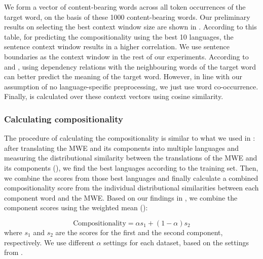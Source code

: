 \documentclass[output=paper,modfonts,nonflat]{langsci/langscibook}
\begin{document}
We form a vector of content-bearing words across all token occurrences
of the target word, on the basis of these 1000 content-bearing words. Our
preliminary results on selecting the best context window size are
shown in . According to this table, for
predicting the compositionality using the best 10 languages, the
sentence context window results in a higher correlation. We use
sentence boundaries as the context window in the rest of our
experiments. According to \citet{weeds2003} and
\citet{Pado:Lapata:2007}, using dependency relations with the
neighbouring words of the target word can better predict the meaning
of the target word. However, in line with our assumption of no
language-specific preprocessing, we just use word
co-occurrence. Finally,  is calculated over
these context vectors using cosine similarity.

\subsubsection{Calculating compositionality}
\label{sec:computing-compositionality}
The procedure of calculating the compositionality is similar to what
we used in : after translating the MWE and its
components into multiple languages and measuring the distributional
similarity between the translations of the MWE and its components
(), we find the best languages according to the
training set. Then, we combine the scores from those best languages
and finally calculate a combined compositionality score from the
individual distributional similarities between each component word and
the MWE. Based on our findings in , we combine the
component scores using the weighted mean ():

\begin{equation}
  \text{Compositionality} = \alpha s_{1} + (1-\alpha) s_{2}
  \label{eq:comp}
\end{equation} 
where $s_{1}$ and $s_{2}$ are the scores for the first and the second
component, respectively. We use different $\alpha$ settings for each
dataset, based on the settings from .
\end{document}
